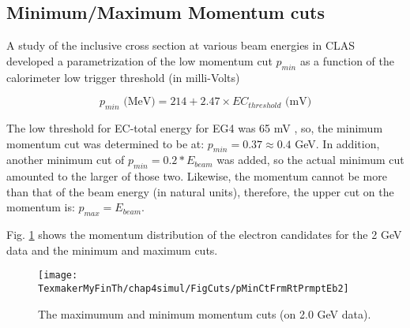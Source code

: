 \subsection{Minimum/Maximum Momentum cuts}
\label{pCuts}
A study \cite{cnKEgiyan} of the inclusive cross section at various beam energies in CLAS developed a parametrization of the low momentum cut $p_{min}$ as a function of the calorimeter low trigger %
threshold (in milli-Volts)%

\begin{equation}
\label{ecThres}
p_{min} \text{ (MeV)} = 214 + 2.47\times EC_{threshold} \text{ (mV)}
\end{equation}

The low threshold for EC-total energy for EG4 was 65 mV \cite{eg4Hm_wb}, so, %
the minimum momentum cut was determined to be at:  $p_{min} = 0.37 \approx 0.4$  GeV. In addition, %
another minimum cut of $p_{min}=0.2*E_{beam}$ was added, so the actual minimum cut amounted to the larger of those two. %
Likewise, the momentum cannot be more than that of the %
beam energy (in natural units), therefore, the upper %
cut on the momentum is: $p_{max}=E_{beam}$.

Fig. \ref{pMnMxCt} shows the momentum distribution of the electron candidates for the 2 GeV data and the minimum and maximum cuts.


\begin{figure}[H]%
\centering
\leavevmode \texttt{[image: TexmakerMyFinTh/chap4simul/FigCuts/pMinCtFrmRtPrmptEb2]}  %
\caption[Maximum and minimum momentum cuts]{The maximumum and minimum momentum cuts (on 2.0 GeV  data).
}
\label{pMnMxCt}
\end{figure}

